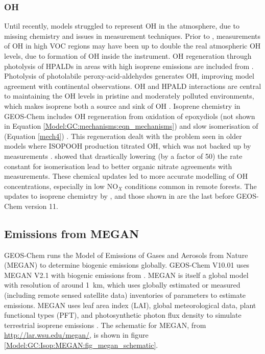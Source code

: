      
    \subsubsection{OH}
    
      Until recently, models struggled to represent OH in the atmosphere, due to missing chemistry and issues in measurement techniques.
      Prior to \textcite{Mao2012}, measurements of OH in high VOC regions may have been up to double the real atmospheric OH levels, due to formation of OH inside the instrument.
      OH regeneration through photolysis of HPALDs in areas with high isoprene emissions are included from \textcite{Peeters2010}.
      Photolysis of photolabile peroxy-acid-aldehydes generates OH, improving model agreement with continental observations.
      OH and HPALD interactions are central to maintaining the OH levels in pristine and moderately polluted environments, which makes isoprene both a source and sink of OH \parencite{Peeters2010,Taraborrelli2012}.
      Isoprene chemistry in GEOS-Chem includes OH regeneration from oxidation of epoxydiols (not shown in Equation \ref{Model:GC:mechanisms:eqn_mechanisms}) and slow isomerisation of \roo (Equation \ref{mech4}) \parencite{Mao2013}.
      This regeneration dealt with the problem seen in older models where ISOPOOH production titrated OH, which was not backed up by measurements \parencite{Paulot2009b,Mao2013}.
      \textcite{Mao2013} showed that drastically lowering (by a factor of 50) the rate constant for \roo isomerisation lead to better organic nitrate agreements with measurements.%
      These chemical updates led to more accurate modelling of OH concentrations, especially in low NO$_X$ conditions common in remote forests.
      The updates to isoprene chemistry by \textcite{Mao2013}, and those shown in \textcite{Crounse2011,Crounse2012} are the last before GEOS-Chem version 11.

  
  \subsection{Emissions from MEGAN}
    \label{Model:GC:MEGAN}
    
    
    GEOS-Chem runs the Model of Emissions of Gases and Aerosols from Nature (MEGAN) to determine biogenic emissions globally.
    GEOS-Chem V10.01 uses MEGAN V2.1 with biogenic emissions from \textcite{Guenther2012}.
    MEGAN is itself a global model with resolution of around 1~km, which uses globally estimated or measured (including remote sensed satellite data) inventories of parameters to estimate emissions.
    MEGAN uses leaf area index (LAI), global meteorological data, plant functional types (PFT), and photosynthetic photon flux density to simulate terrestrial isoprene emissions \parencite{Kefauver2014}.
    The schematic for MEGAN, from \url{http://lar.wsu.edu/megan/}, is shown in figure \ref{Model:GC:Isop:MEGAN:fig_megan_schematic}.
    
